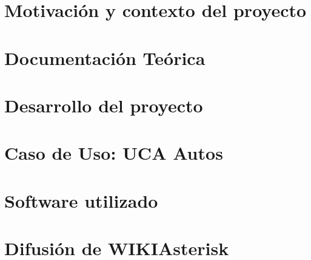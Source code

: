 \documentclass[a4paper,11pt]{book}
\begin{document}
\renewcommand{\listfigurename}{Indice de figuras}
\renewcommand{\tablename}{Tabla}
\renewcommand{\listtablename}{Indice de tablas}


\pagestyle{empty}

\cleardoublepage


\cleardoublepage
\pagestyle{plain}

\frontmatter %


\cleardoublepage

\tableofcontents
\listoffigures
\listoftables

\mainmatter %

\chapter{Motivación y contexto del proyecto}

\chapter{Documentación Teórica}


\chapter{Desarrollo del proyecto}


\chapter{Caso de Uso: UCA Autos}




\backmatter %

\clearpage

\chapter*{Software utilizado}


\chapter*{Difusión de WIKIAsterisk}\label{cap:difusion}




\nocite{atdg11}
\nocite{website:voipinfo}
\nocite{website:asterisk}


\end{document}
